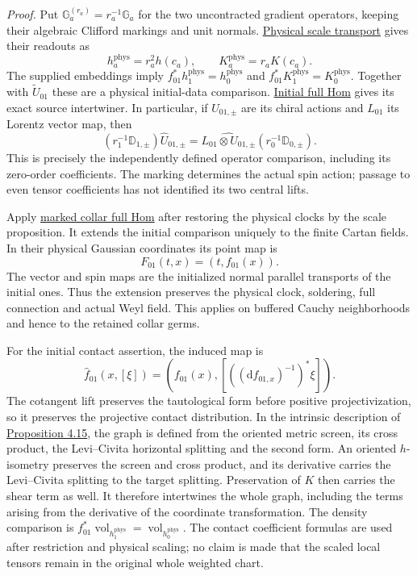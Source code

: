 \documentclass[
  english,
  11pt,
  reqno]{amsart}
\begin{document}
\emph{Proof.} Put \(\mathbb G_a^{(r_a)}=r_a^{-1}\mathbb G_a\) for the
two uncontracted gradient operators, keeping their algebraic Clifford
markings and unit normals.
\hyperref[prop:online-cartan-physical-scale]{Physical scale transport}
gives their readouts as \[
h_a^{\mathrm{phys}}=r_a^2h(c_a),\qquad
K_a^{\mathrm{phys}}=r_aK(c_a).
\] The supplied embeddings imply
\(f_{01}^*h_1^{\mathrm{phys}}=h_0^{\mathrm{phys}}\) and
\(f_{01}^*K_1^{\mathrm{phys}}=K_0^{\mathrm{phys}}\). Together with
\(\widetilde U_{01}\) these are a physical initial-data comparison.
\hyperref[thm:online-initial-gradient-full-hom]{Initial full Hom} gives
its exact source intertwiner. In particular, if \(U_{01,\pm}\) are its
chiral actions and \(L_{01}\) its Lorentz vector map, then%
\[
(r_1^{-1}\mathbb D_{1,\pm})\widehat U_{01,\pm}
=\widehat{L_{01}\otimes U_{01,\pm}}
  (r_0^{-1}\mathbb D_{0,\pm}).
\] This is precisely the independently defined operator comparison,
including its zero-order coefficients. The marking determines the actual
spin action; passage to even tensor coefficients has not identified its
two central lifts.

Apply \hyperref[thm:online-marked-collar-full-hom]{marked collar full
Hom} after restoring the physical clocks by the scale proposition. It
extends the initial comparison uniquely to the finite Cartan fields. In
their physical Gaussian coordinates its point map is%
\[
F_{01}(t,x)=(t,f_{01}(x)).
\] The vector and spin maps are the initialized normal parallel
transports of the initial ones. Thus the extension preserves the
physical clock, soldering, full connection and actual Weyl field. This
applies on buffered Cauchy neighborhoods and hence to the retained
collar germs.

For the initial contact assertion, the induced map is%
 \[
\widehat f_{01}(x,[\xi])
=\left(f_{01}(x),
  [((\mathrm df_{01,x})^{-1})^*\xi]\right).
\] The cotangent lift preserves the tautological form before positive
projectivization, so it preserves the projective contact distribution.
In the intrinsic description of
\hyperref[prop:online-contact-complete-kinematic-codec]{Proposition
4.15}, the graph is defined from the oriented metric screen, its cross
product, the Levi--Civita horizontal splitting and the second form. An
oriented \(h\)-isometry preserves the screen and cross product, and its
derivative carries the Levi--Civita splitting to the target splitting.
Preservation of \(K\) then carries the shear term as well. It therefore
intertwines the whole graph, including the terms arising from the
derivative of the coordinate transformation. The density comparison is
\(f_{01}^*\operatorname{vol}_{h_1^{\mathrm{phys}}}
=\operatorname{vol}_{h_0^{\mathrm{phys}}}\). The contact coefficient
formulas are used after restriction and physical scaling; no claim is
made that the scaled local tensors remain in the original whole weighted
chart.
\end{document}

